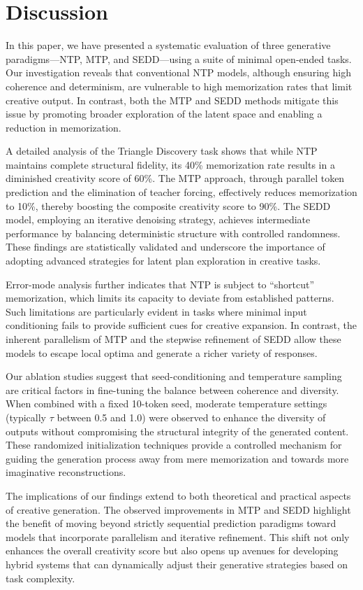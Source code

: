 \documentclass[12pt]{article}
\begin{document}
\section{Discussion}
In this paper, we have presented a systematic evaluation of three generative paradigms—NTP, MTP, and SEDD—using a suite of minimal open‐ended tasks. Our investigation reveals that conventional NTP models, although ensuring high coherence and determinism, are vulnerable to high memorization rates that limit creative output. In contrast, both the MTP and SEDD methods mitigate this issue by promoting broader exploration of the latent space and enabling a reduction in memorization.

A detailed analysis of the Triangle Discovery task shows that while NTP maintains complete structural fidelity, its 40\% memorization rate results in a diminished creativity score of 60\%. The MTP approach, through parallel token prediction and the elimination of teacher forcing, effectively reduces memorization to 10\%, thereby boosting the composite creativity score to 90\%. The SEDD model, employing an iterative denoising strategy, achieves intermediate performance by balancing deterministic structure with controlled randomness. These findings are statistically validated and underscore the importance of adopting advanced strategies for latent plan exploration in creative tasks.

Error-mode analysis further indicates that NTP is subject to “shortcut” memorization, which limits its capacity to deviate from established patterns. Such limitations are particularly evident in tasks where minimal input conditioning fails to provide sufficient cues for creative expansion. In contrast, the inherent parallelism of MTP and the stepwise refinement of SEDD allow these models to escape local optima and generate a richer variety of responses.

Our ablation studies suggest that seed-conditioning and temperature sampling are critical factors in fine-tuning the balance between coherence and diversity. When combined with a fixed 10-token seed, moderate temperature settings (typically \(\tau\) between 0.5 and 1.0) were observed to enhance the diversity of outputs without compromising the structural integrity of the generated content. These randomized initialization techniques provide a controlled mechanism for guiding the generation process away from mere memorization and towards more imaginative reconstructions.

The implications of our findings extend to both theoretical and practical aspects of creative generation. The observed improvements in MTP and SEDD highlight the benefit of moving beyond strictly sequential prediction paradigms toward models that incorporate parallelism and iterative refinement. This shift not only enhances the overall creativity score but also opens up avenues for developing hybrid systems that can dynamically adjust their generative strategies based on task complexity.
\end{document}
